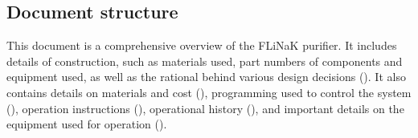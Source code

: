 %
%

\subsection{Document structure}

This document is a comprehensive overview of the FLiNaK purifier. It includes
details of construction, such as materials used, part numbers of components
and equipment used, as well as the rational behind various design decisions
(). It also contains details on materials and cost
(), programming used to control the system
(), operation instructions (),
operational history (),
and important details on the equipment
used for operation ().
